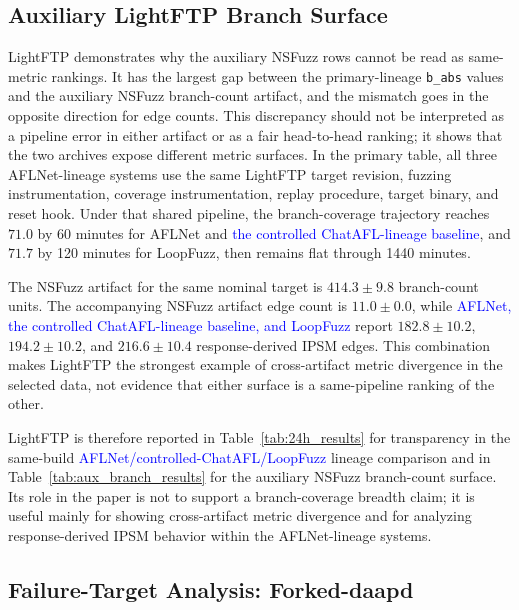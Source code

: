 \documentclass[final,5p,times,number]{elsarticle}
\begin{document}
\subsection{Auxiliary LightFTP Branch Surface}
\label{sec:lightftp_anomaly}

LightFTP demonstrates why the auxiliary NSFuzz rows cannot be read as same-metric rankings. It has the largest gap between the primary-lineage \texttt{b\_abs} values and the auxiliary NSFuzz branch-count artifact, and the mismatch goes in the opposite direction for edge counts. This discrepancy should not be interpreted as a pipeline error in either artifact or as a fair head-to-head ranking; it shows that the two archives expose different metric surfaces. In the primary table, all three AFLNet-lineage systems use the same LightFTP target revision, fuzzing instrumentation, coverage instrumentation, replay procedure, target binary, and reset hook. Under that shared pipeline, the branch-coverage trajectory reaches $71.0$ by 60 minutes for AFLNet and \textcolor{blue}{the controlled ChatAFL-lineage baseline}, and $71.7$ by 120 minutes for LoopFuzz, then remains flat through 1440 minutes.

The NSFuzz artifact for the same nominal target is $414.3{\pm}9.8$ branch-count units. The accompanying NSFuzz artifact edge count is $11.0{\pm}0.0$, while \textcolor{blue}{AFLNet, the controlled ChatAFL-lineage baseline, and LoopFuzz} report $182.8{\pm}10.2$, $194.2{\pm}10.2$, and $216.6{\pm}10.4$ response-derived IPSM edges. This combination makes LightFTP the strongest example of cross-artifact metric divergence in the selected data, not evidence that either surface is a same-pipeline ranking of the other.

LightFTP is therefore reported in Table~\ref{tab:24h_results} for transparency in the same-build \textcolor{blue}{AFLNet/controlled-ChatAFL/LoopFuzz} lineage comparison and in Table~\ref{tab:aux_branch_results} for the auxiliary NSFuzz branch-count surface. Its role in the paper is not to support a branch-coverage breadth claim; it is useful mainly for showing cross-artifact metric divergence and for analyzing response-derived IPSM behavior within the AFLNet-lineage systems.

\subsection{Failure-Target Analysis: Forked-daapd}
\label{sec:forked_failure}
\end{document}
